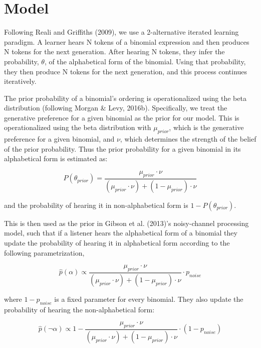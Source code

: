 \documentclass[
  jou,floatsintext]{apa6}
\begin{document}
\section{Model}\label{model}

Following Reali and Griffiths (2009), we use a 2-alternative iterated learning paradigm. A learner hears N tokens of a binomial expression and then produces N tokens for the next generation. After hearing N tokens, they infer the probability, \(\theta\), of the alphabetical form of the binomial. Using that probability, they then produce N tokens for the next generation, and this process continues iteratively.

The prior probability of a binomial's ordering is operationalized using the beta distribution (following Morgan \& Levy, 2016b). Specifically, we treat the generative preference for a given binomial as the prior for our model. This is operationalized using the beta distribution with \(\mu_{prior}\), which is the generative preference for a given binomial, and \(\nu\), which determines the strength of the belief of the prior probability. Thus the prior probability for a given binomial in its alphabetical form is estimated as:

\begin{equation}
\label{eq:thetaPrior}
P(\theta_{prior}) = \frac{\mu_{prior} \cdot \nu}{(\mu_{prior} \cdot \nu) + (1 - \mu_{prior}) \cdot \nu}
\end{equation}

and the probability of hearing it in non-alphabetical form is \(1-P(\theta_{prior})\).

This is then used as the prior in Gibson et al. (2013)'s noisy-channel processing model, such that if a listener hears the alphabetical form of a binomial they update the probability of hearing it in alphabetical form according to the following parametrization,

\begin{equation}
\label{eq:phatAlpha}
\hat{p}(\alpha) \propto \frac{\mu_{prior} \cdot \nu}{(\mu_{prior} \cdot \nu) + (1 - \mu_{prior}) \cdot \nu} \cdot p_{noise}
\end{equation}

where \(1 - p_{noise}\) is a fixed parameter for every binomial. They also update the probability of hearing the non-alphabetical form:

\begin{equation}
\label{eq:phatNonalpha}
\hat{p}(\neg\alpha) \propto 1 - \frac{\mu_{prior} \cdot \nu}{(\mu_{prior} \cdot \nu) + (1 - \mu_{prior}) \cdot \nu} \cdot (1-p_{noise})
\end{equation}
\end{document}
